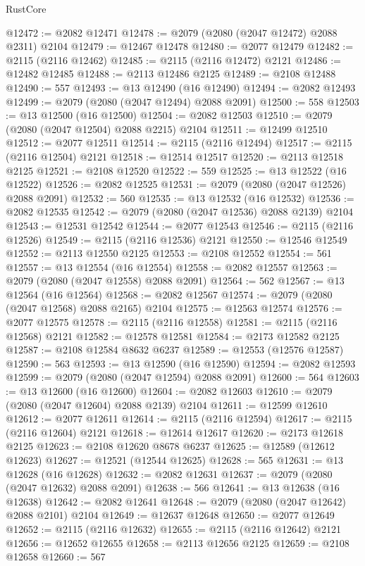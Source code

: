 \begin{lexlean}{RustCore}
\begin{coremodule}
@12472 := @2082 @12471
@12478 := @2079 (@2080 (@2047 @12472) @2088 @2311) @2104
@12479 := @12467 @12478
@12480 := @2077 @12479
@12482 := @2115 (@2116 @12462)
@12485 := @2115 (@2116 @12472) @2121
@12486 := @12482 @12485
@12488 := @2113 @12486 @2125
@12489 := @2108 @12488
@12490 := 557
@12493 := @13 @12490 (@16 @12490)
@12494 := @2082 @12493
@12499 := @2079 (@2080 (@2047 @12494) @2088 @2091)
@12500 := 558
@12503 := @13 @12500 (@16 @12500)
@12504 := @2082 @12503
@12510 := @2079 (@2080 (@2047 @12504) @2088 @2215) @2104
@12511 := @12499 @12510
@12512 := @2077 @12511
@12514 := @2115 (@2116 @12494)
@12517 := @2115 (@2116 @12504) @2121
@12518 := @12514 @12517
@12520 := @2113 @12518 @2125
@12521 := @2108 @12520
@12522 := 559
@12525 := @13 @12522 (@16 @12522)
@12526 := @2082 @12525
@12531 := @2079 (@2080 (@2047 @12526) @2088 @2091)
@12532 := 560
@12535 := @13 @12532 (@16 @12532)
@12536 := @2082 @12535
@12542 := @2079 (@2080 (@2047 @12536) @2088 @2139) @2104
@12543 := @12531 @12542
@12544 := @2077 @12543
@12546 := @2115 (@2116 @12526)
@12549 := @2115 (@2116 @12536) @2121
@12550 := @12546 @12549
@12552 := @2113 @12550 @2125
@12553 := @2108 @12552
@12554 := 561
@12557 := @13 @12554 (@16 @12554)
@12558 := @2082 @12557
@12563 := @2079 (@2080 (@2047 @12558) @2088 @2091)
@12564 := 562
@12567 := @13 @12564 (@16 @12564)
@12568 := @2082 @12567
@12574 := @2079 (@2080 (@2047 @12568) @2088 @2165) @2104
@12575 := @12563 @12574
@12576 := @2077 @12575
@12578 := @2115 (@2116 @12558)
@12581 := @2115 (@2116 @12568) @2121
@12582 := @12578 @12581
@12584 := @2173 @12582 @2125
@12587 := @2108 @12584 @8632 @6237
@12589 := @12553 (@12576 @12587)
@12590 := 563
@12593 := @13 @12590 (@16 @12590)
@12594 := @2082 @12593
@12599 := @2079 (@2080 (@2047 @12594) @2088 @2091)
@12600 := 564
@12603 := @13 @12600 (@16 @12600)
@12604 := @2082 @12603
@12610 := @2079 (@2080 (@2047 @12604) @2088 @2139) @2104
@12611 := @12599 @12610
@12612 := @2077 @12611
@12614 := @2115 (@2116 @12594)
@12617 := @2115 (@2116 @12604) @2121
@12618 := @12614 @12617
@12620 := @2173 @12618 @2125
@12623 := @2108 @12620 @8678 @6237
@12625 := @12589 (@12612 @12623)
@12627 := @12521 (@12544 @12625)
@12628 := 565
@12631 := @13 @12628 (@16 @12628)
@12632 := @2082 @12631
@12637 := @2079 (@2080 (@2047 @12632) @2088 @2091)
@12638 := 566
@12641 := @13 @12638 (@16 @12638)
@12642 := @2082 @12641
@12648 := @2079 (@2080 (@2047 @12642) @2088 @2101) @2104
@12649 := @12637 @12648
@12650 := @2077 @12649
@12652 := @2115 (@2116 @12632)
@12655 := @2115 (@2116 @12642) @2121
@12656 := @12652 @12655
@12658 := @2113 @12656 @2125
@12659 := @2108 @12658
@12660 := 567

\end{coremodule}
\end{lexlean}
